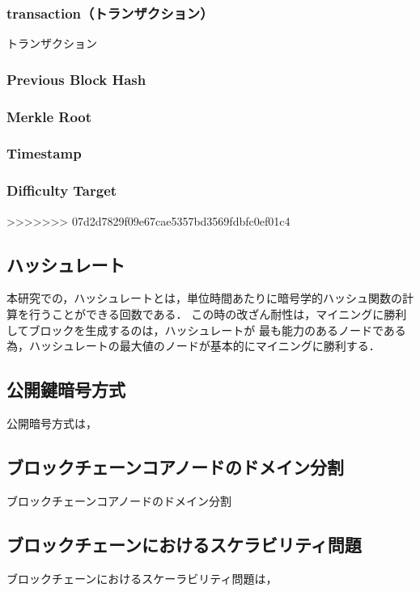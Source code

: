 \documentclass[a4paper,12pt]{jsarticle}
\begin{document}
            \subsubsection{transaction（トランザクション）}
トランザクション
            \subsubsection{Previous Block Hash}
            \subsubsection{Merkle Root}
            \subsubsection{Timestamp}
            \subsubsection{Difficulty Target}



>>>>>>> 07d2d7829f09e67cae5357bd3569fdbfc0ef01c4
      \subsection{ハッシュレート}
本研究での，ハッシュレートとは，単位時間あたりに暗号学的ハッシュ関数の計算を行うことができる回数である．
この時の改ざん耐性は，マイニングに勝利してブロックを生成するのは，ハッシュレートが
最も能力のあるノードである為，ハッシュレートの最大値のノードが基本的にマイニングに勝利する．

      \subsection{公開鍵暗号方式}

公開暗号方式は，


      \subsection{ブロックチェーンコアノードのドメイン分割}
ブロックチェーンコアノードのドメイン分割

      \subsection{ブロックチェーンにおけるスケラビリティ問題}
ブロックチェーンにおけるスケーラビリティ問題は，
\end{document}
